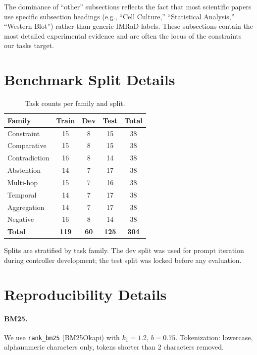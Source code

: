 \documentclass{article}
\begin{document}
The dominance of ``other'' subsections reflects the fact that most scientific papers use specific subsection headings (e.g., ``Cell Culture,'' ``Statistical Analysis,'' ``Western Blot'') rather than generic IMRaD labels. These subsections contain the most detailed experimental evidence and are often the locus of the constraints our tasks target.

\section{Benchmark Split Details}
\label{app:splits}

\begin{table}[h]
\centering
\caption{Task counts per family and split.}
\small
\begin{tabular}{lcccc}
\toprule
\textbf{Family} & \textbf{Train} & \textbf{Dev} & \textbf{Test} & \textbf{Total} \\
\midrule
Constraint & 15 & 8 & 15 & 38 \\
Comparative & 15 & 8 & 15 & 38 \\
Contradiction & 16 & 8 & 14 & 38 \\
Abstention & 14 & 7 & 17 & 38 \\
Multi-hop & 15 & 7 & 16 & 38 \\
Temporal & 14 & 7 & 17 & 38 \\
Aggregation & 14 & 7 & 17 & 38 \\
Negative & 16 & 8 & 14 & 38 \\
\midrule
\textbf{Total} & \textbf{119} & \textbf{60} & \textbf{125} & \textbf{304} \\
\bottomrule
\end{tabular}
\label{tab:splits}
\end{table}

Splits are stratified by task family. The dev split was used for prompt iteration during controller development; the test split was locked before any evaluation.

\section{Reproducibility Details}
\label{app:repro}

\paragraph{BM25.} We use \texttt{rank\_bm25} (BM25Okapi) with $k_1{=}1.2$, $b{=}0.75$. Tokenization: lowercase, alphanumeric characters only, tokens shorter than 2 characters removed.
\end{document}
